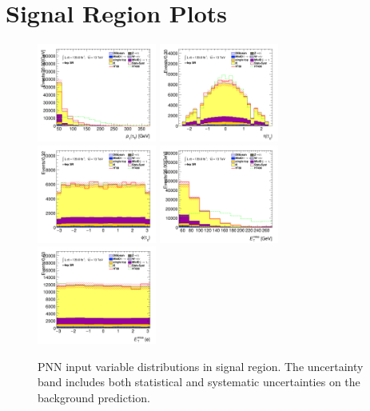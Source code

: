 		\clearpage
	\section{\taulep Signal Region Plots}\label{sec:taulep-sr-plots}
		\clearpage
		\begin{figure}[!htp]
			\begin{center}    
			\includegraphics[width=0.35\textwidth]{chapters/chapter6_HPlus/images/taulep/tau_0_pt_SR_TAULEP.png}
			\includegraphics[width=0.35\textwidth]{chapters/chapter6_HPlus/images/taulep/tau_0_eta_SR_TAULEP.png} \\
			\includegraphics[width=0.35\textwidth]{chapters/chapter6_HPlus/images/taulep/tau_0_phi_SR_TAULEP.png}
			\includegraphics[width=0.35\textwidth]{chapters/chapter6_HPlus/images/taulep/met_et_SR_TAULEP.png} \\
			\includegraphics[width=0.35\textwidth]{chapters/chapter6_HPlus/images/taulep/met_phi_SR_TAULEP.png} 
			\end{center}
			\caption{
			PNN input variable distributions in \taulep signal region. The uncertainty band includes both statistical and systematic uncertainties on the background prediction. 
			}
			\label{fig:sr-taulep-1}
		\end{figure}

